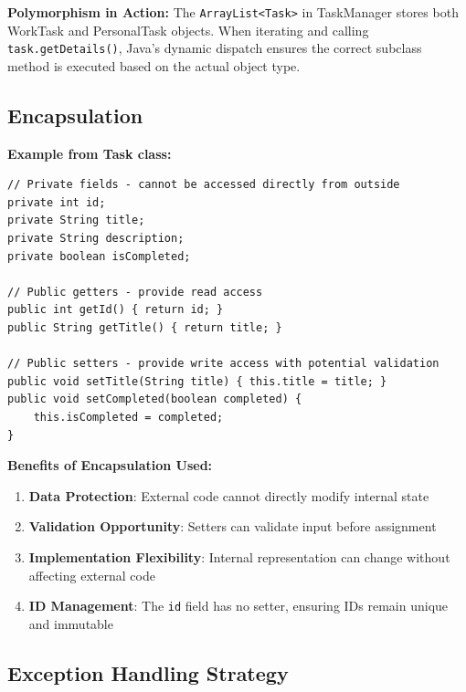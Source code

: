 \documentclass[12pt,a4paper]{article}
\begin{document}
\textbf{Polymorphism in Action:}
The \texttt{ArrayList<Task>} in TaskManager stores both WorkTask and PersonalTask objects. When iterating and calling \texttt{task.getDetails()}, Java's dynamic dispatch ensures the correct subclass method is executed based on the actual object type.

\subsection{Encapsulation}
\textbf{Example from Task class:}

\begin{lstlisting}[caption={Encapsulation in Task Class}]
// Private fields - cannot be accessed directly from outside
private int id;
private String title;
private String description;
private boolean isCompleted;

// Public getters - provide read access
public int getId() { return id; }
public String getTitle() { return title; }

// Public setters - provide write access with potential validation
public void setTitle(String title) { this.title = title; }
public void setCompleted(boolean completed) { 
    this.isCompleted = completed; 
}
\end{lstlisting}
\newpage
\textbf{Benefits of Encapsulation Used:}
\begin{enumerate}
    \item \textbf{Data Protection}: External code cannot directly modify internal state
    \item \textbf{Validation Opportunity}: Setters can validate input before assignment
    \item \textbf{Implementation Flexibility}: Internal representation can change without affecting external code
    \item \textbf{ID Management}: The \texttt{id} field has no setter, ensuring IDs remain unique and immutable
\end{enumerate}

\subsection{Exception Handling Strategy}
\end{document}
